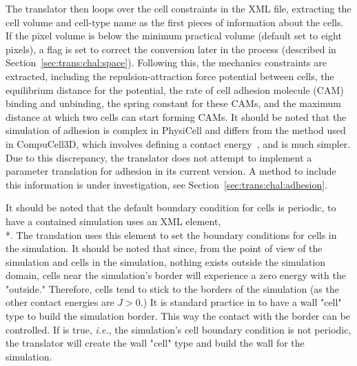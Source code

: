 The translator then loops over the cell constraints in the XML file, extracting the cell volume and cell-type name as the first pieces of information about the cells. If the pixel volume is below the minimum practical volume (default set to eight pixels), a flag is set to correct the conversion later in the process (described in Section~\ref{sec:trans:chal:space}). Following this, the mechanics constraints are extracted, including the repulsion-attraction force potential between cells, the equilibrium distance for the potential, the rate of cell adhesion molecule (CAM)~\cite{lodish2008molecular} binding and unbinding, the spring constant for these CAMs, and the maximum distance at which two cells can start forming CAMs. It should be noted that the simulation of adhesion is complex in PhysiCell and differs from the method used in CompuCell3D, which involves defining a contact energy~\cite{swat_multi-scale_2012}, and is much simpler. Due to this discrepancy, the translator does not attempt to implement a parameter translation for adhesion in its current version. A method to include this information is under investigation, see Section~\ref{sec:trans:chal:adhesion}.

It should be noted that the default boundary condition for \pscs cells is periodic, to have a contained simulation \pscs uses an XML element, \\*. The translation uses this element to set the boundary conditions for cells in the \ccds simulation. It should be noted that since, from the point of view of the simulation and cells in the simulation, nothing exists outside the simulation domain, cells near the simulation's border will experience a zero energy with the "outside." Therefore, cells tend to stick to the borders of the simulation (as the other contact energies are $J>0$.) It is standard practice in \ccds to have a wall "cell" type to build the simulation border. This way the contact with the border can be controlled. If  is true, \textit{i.e.}, the simulation's cell boundary condition is not periodic, the translator will create the wall "cell" type and build the wall for the simulation.

